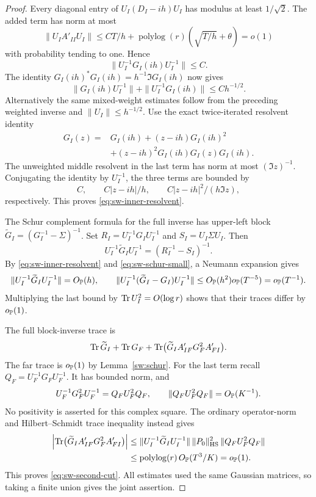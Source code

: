 \begin{proof}
Every diagonal entry of \(U_I(D_I-ih)U_I\) has modulus at least
\(1/\sqrt2\). The added term has norm at most
\[
 \|U_IA'_{II}U_I\|
 \le C T/h+\operatorname{polylog}(r)
       \left(\sqrt{T/h}+\theta\right)=o(1)
\]
with probability tending to one. Hence
\[
 \|U_I^{-1}G_I(ih)U_I^{-1}\|\le C.
\]
The identity \(G_I(ih)^*G_I(ih)=h^{-1}\Im G_I(ih)\) now gives
\[
 \|G_I(ih)U_I^{-1}\|+\|U_I^{-1}G_I(ih)\|
 \le C h^{-1/2}.
\]
Alternatively the same mixed-weight estimates follow from the preceding
weighted inverse and \(\|U_I\|\le h^{-1/2}\).
Use the exact twice-iterated resolvent identity
\begin{align*}
 G_I(z)
 ={}&G_I(ih)+(z-ih)G_I(ih)^2\\
 &+(z-ih)^2G_I(ih)G_I(z)G_I(ih).
\end{align*}
The unweighted middle resolvent in the last term has norm at most
\((\Im z)^{-1}\). Conjugating the identity by \(U_I^{-1}\), the three
terms are bounded by
\[
 C,\qquad C|z-ih|/h,\qquad
 C|z-ih|^2/(h\Im z),
\]
respectively. This proves \eqref{eq:sw-inner-resolvent}.

The Schur complement formula for the full inverse has upper-left block
\(\widetilde G_I=(G_I^{-1}-\Sigma)^{-1}\).
Set \(R_I=U_I^{-1}G_IU_I^{-1}\) and \(S_I=U_I\Sigma U_I\).
Then
\[
 U_I^{-1}\widetilde G_IU_I^{-1}
 =(R_I^{-1}-S_I)^{-1}.
\]
By \eqref{eq:sw-inner-resolvent} and
\eqref{eq:sw-schur-small}, a Neumann expansion gives
\[
 \|U_I^{-1}\widetilde G_IU_I^{-1}\|=O_{\mathbb P}(h),\qquad
 \|U_I^{-1}(\widetilde G_I-G_I)U_I^{-1}\|
 \le O_{\mathbb P}(h^2)o_{\mathbb P}(T^{-5})=o_{\mathbb P}(T^{-1}).
\]
Multiplying the last bound by \(\operatorname{Tr} U_I^2=O(\log r)\) shows that their
traces differ by \(o_{\mathbb P}(1)\).

The full block-inverse trace is
\[
 \operatorname{Tr}\widetilde G_I+\operatorname{Tr} G_F+
 \operatorname{Tr}\bigl(\widetilde G_IA'_{IF}G_F^2A'_{FI}\bigr).
\]
The far trace is \(o_{\mathbb P}(1)\) by Lemma~\ref{sw:schur}.
For the last term recall \(Q_F=U_F^{-1}G_FU_F^{-1}\).
It has bounded norm, and
\[
 U_F^{-1}G_F^2U_F^{-1}=Q_FU_F^2Q_F,\qquad
 \|Q_FU_F^2Q_F\|=O_{\mathbb P}(K^{-1}).
\]
No positivity is asserted for this complex square. The ordinary
operator-norm and Hilbert--Schmidt trace inequality instead gives
\begin{align*}
 \left|\operatorname{Tr}\bigl(\widetilde G_IA'_{IF}G_F^2A'_{FI}\bigr)\right|
 &\le
 \|U_I^{-1}\widetilde G_IU_I^{-1}\|\,
 \|P_0\|_{\mathrm{HS}}^2\,
 \|Q_FU_F^2Q_F\|\\
 &\le \operatorname{polylog}(r)\,O_{\mathbb P}(T^3/K)=o_{\mathbb P}(1).
\end{align*}
This proves \eqref{eq:sw-second-cut}. All estimates used the same Gaussian
matrices, so taking a finite union gives the joint assertion.
\end{proof}

